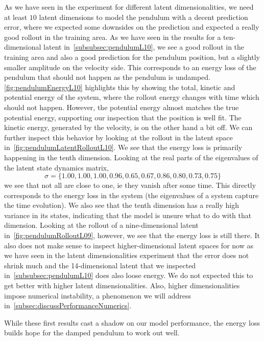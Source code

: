 		As we have seen in the experiment for different latent dimensionalities, we need at least \(10\) latent dimensions to model the pendulum with a decent prediction error, where we expected some downsides on the prediction and expected a really good rollout in the training area. As we have seen in the results for a ten-dimensional latent in~\autoref{subsubsec:pendulumL10}, we see a good rollout in the training area and also a good prediction for the pendulum position, but a slightly smaller amplitude on the velocity side. This corresponds to an energy loss of the pendulum that should not happen as the pendulum is undamped.\autoref{fig:pendulumEnergyL10} highlights this by showing the total, kinetic and potential energy of the system, where the rollout energy changes with time which should not happen. However, the potential energy almost matches the true potential energy, supporting our inspection that the position is well fit. The kinetic energy, generated by the velocity, is on the other hand a bit off. We can further inspect this behavior by looking at the rollout in the latent space in~\autoref{fig:pendulumLatentRolloutL10}. We see that the energy loss is primarily happening in the tenth dimension. Looking at the real parts of the eigenvalues of the latent state dynamics matrix,
		\begin{equation*}
			\sigma = \{ 1.00, 1.00, 1.00, 0.96, 0.65, 0.67, 0.86, 0.80, 0.73, 0.75 \}
		\end{equation*}
		we see that not all are close to one, \ac{ie} they vanish after some time. This directly corresponds to the energy loss in the system (the eigenvalues of a system capture the time evolution). We also see that the tenth dimension has a really high variance in its states, indicating that the model is unsure what to do with that dimension. Looking at the rollout of a nine-dimensional latent in~\autoref{fig:pendulumRolloutL09}, however, we see that the energy loss is still there. It also does not make sense to inspect higher-dimensional latent spaces for now as we have seen in the latent dimensionalities experiment that the error does not shrink much and the 14-dimensional latent that we inspected in~\autoref{subsubsec:pendulumL10} does also loose energy. We do not expected this to get better with higher latent dimensionalities. Also, higher dimensionalities impose numerical instability, a phenomenon we will address in~\autoref{subsec:discussPerformanceNumerics}.

		While these first results cast a shadow on our model performance, the energy loss builds hope for the damped pendulum to work out well.

